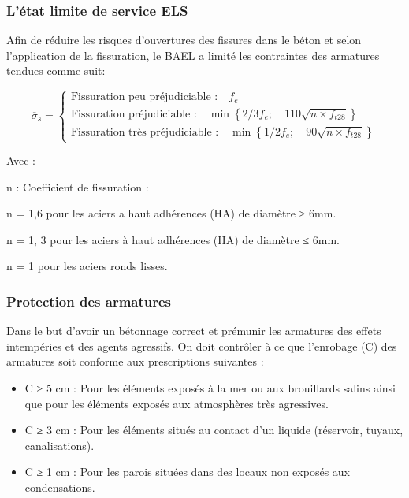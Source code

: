 \documentclass[12pt,a4paper]{report}
\numberwithin{equation}{section}
\newcommand{\sigmabar}[1]{\overline{\sigma}_{#1}}
\begin{document}
	\subsubsection{L'état limite de service ELS}
	
	Afin de réduire les risques d'ouvertures des fissures dans le béton et selon l'application de la fissuration, le BAEL a limité les contraintes des armatures tendues comme suit\footnotemark[2] :

	\begin{equation}
		\sigmabar{s} = \begin{cases}
			\text{Fissuration peu préjudiciable :}\quad f_{e} \\
			\text{Fissuration préjudiciable :}\quad \min\left\{ 2/3f_{e} ;\quad 110\sqrt{n \times f_{t28}} \right\} \\
			\text{Fissuration très préjudiciable :}\quad \min\left\{ 1/2f_{e} ;\quad 90\sqrt{n \times f_{t28}} \right\}
		\end{cases}
		\label{eq:contrainte-acier-els}
	\end{equation}

	
	
	Avec :
	
	n :  Coefficient de fissuration :
	
	n = 1,6 pour les aciers a haut adhérences (HA) de diamètre ≥ 6mm.
	
	n = 1, 3 pour les aciers à haut adhérences (HA) de diamètre ≤ 6mm.
	
	n = 1 pour les aciers ronds lisses.
	
	
	\subsubsection{Protection des armatures}

	Dans le but d’avoir un bétonnage correct et prémunir les armatures des effets
	intempéries et des agents agressifs. On doit contrôler à ce que l’enrobage (C) des
	armatures soit conforme aux prescriptions suivantes :
	
	\begin{itemize}
		\item  C ≥ 5 cm : Pour les éléments exposés à la mer ou aux brouillards salins ainsi que
		pour les éléments exposés aux atmosphères très agressives.
		
		\item  C ≥ 3 cm : Pour les éléments situés au contact d’un liquide (réservoir, tuyaux,
		canalisations).
		
		\item  C ≥ 1 cm : Pour les parois situées dans des locaux non exposés aux condensations.
	\end{itemize}
\end{document}
